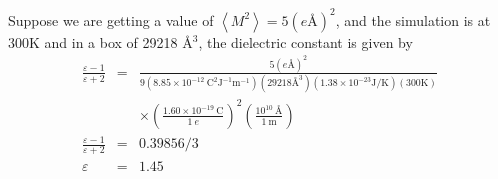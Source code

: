 \documentclass[aps, 12pt, amsmath, amssymb, onecolumn, notitlepage, nofootinbib]{revtex4-1}
\begin{document}
Suppose we are getting a value of $\left\langle M^2 \right\rangle = 5 (e\text{\AA})^2$, and the simulation is at 300K and in a box of 29218 \AA$^3$, the dielectric constant is given by
\begin{eqnarray}
\frac{\varepsilon-1}{\varepsilon+2} &=& \frac{ 5 (e\text{\AA})^2}{9  \left( 8.85 \times 10^{-12}\ \text{C}^2 \text{J}^{-1} \text{m}^{-1} \right) \left( 29218 \text{\AA}^3 \right) (1.38 
\times 10^{-23} \text{J/K}) (300 \text{K})  }\nonumber\\
&& \times\left( \frac{ 1.60 \times 10^{-19}\ \text{C} }{1\ e}\right)^2 \left( \frac{10^{10}\ \text{\AA}}{1\ \text{m}} \right)\nonumber\\
\frac{\varepsilon-1}{\varepsilon+2} &=& 0.39856/3\nonumber\\
\varepsilon &=& 1.45
\end{eqnarray}




\end{document}

